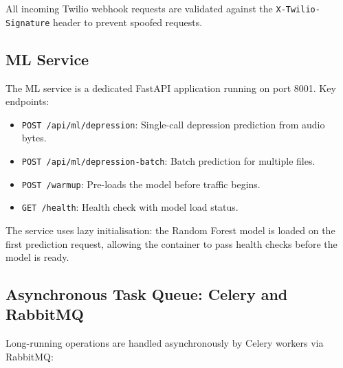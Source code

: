 All incoming Twilio webhook requests are validated against the \texttt{X-Twilio-Signature} header to prevent spoofed requests.

\subsection{ML Service}

The ML service is a dedicated FastAPI application running on port 8001. Key endpoints:
\begin{itemize}
    \item \texttt{POST /api/ml/depression}: Single-call depression prediction from audio bytes.
    \item \texttt{POST /api/ml/depression-batch}: Batch prediction for multiple files.
    \item \texttt{POST /warmup}: Pre-loads the model before traffic begins.
    \item \texttt{GET /health}: Health check with model load status.
\end{itemize}

The service uses lazy initialisation: the Random Forest model is loaded on the first prediction request, allowing the container to pass health checks before the model is ready.

\subsection{Asynchronous Task Queue: Celery and RabbitMQ}

Long-running operations are handled asynchronously by Celery workers via RabbitMQ:

\begin{table}[h]
\centering
\caption{Celery tasks in the system.}
\label{tab:celery_tasks}
\end{table}

